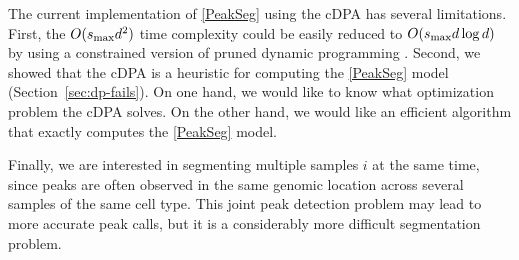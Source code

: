 \documentclass{article}
\begin{document}
The current implementation of \ref{PeakSeg} using the cDPA has several
limitations. First, the $O(s_{\text{\text{max}}} d^2)$ time complexity
could be easily reduced to $O(s_{\text{\text{max}}} d\log d)$ by using
a constrained version of pruned dynamic programming \citep{pruned-dp,
  Segmentor}. Second, we showed that the cDPA is a heuristic for
computing the \ref{PeakSeg} model (Section~\ref{sec:dp-fails}). On one
hand, we would like to know what optimization problem the cDPA
solves. On the other hand, we would like an efficient algorithm that
exactly computes the \ref{PeakSeg} model.

Finally, we are interested in segmenting multiple samples $i$ at the
same time, since peaks are often observed in the same genomic location
across several samples of the same cell type. This joint peak
detection problem may lead to more accurate peak calls, but it is a
considerably more difficult segmentation problem.


\newpage





\end{document}
